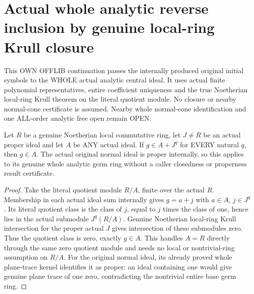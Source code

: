 \section{Actual whole analytic reverse inclusion by genuine local-ring Krull closure}
This OWN OFFLIB continuation passes the internally produced original initial symbols to the WHOLE actual analytic central ideal. It uses actual finite polynomial representatives, entire coefficient uniqueness and the true Noetherian local-ring Krull theorem on the literal quotient module. No closure or nearby normal-cone certificate is assumed. Nearby whole normal-cone identification and one ALL-order analytic free open remain OPEN.

\begin{lemma}
\label{hir:relative-normal-graph-central-actual-krull-ideal-closure}
\leanok
Let $R$ be a genuine Noetherian local commutative ring, let $J\ne R$ be an actual proper ideal and let $A$ be ANY actual ideal. If $g\in A+J^q$ for EVERY natural $q$, then $g\in A$. The actual original normal ideal is proper internally, so this applies to its genuine whole analytic germ ring without a caller closedness or properness result certificate.
\end{lemma}
\begin{proof}
Take the literal quotient module $R/A$, finite over the actual $R$. Membership in each actual ideal sum internally gives $g=a+j$ with $a\in A$, $j\in J^q$. Its literal quotient class is the class of $j$, equal to $j$ times the class of one, hence lies in the actual submodule $J^q(R/A)$. Genuine Noetherian local-ring Krull intersection for the proper actual $J$ gives intersection of these submodules zero. Thus the quotient class is zero, exactly $g\in A$. This handles $A=R$ directly through the same zero quotient module and needs no local or nontrivial-ring assumption on $R/A$. For the original normal ideal, its already proved whole plane-trace kernel identifies it as proper: an ideal containing one would give genuine plane trace of one zero, contradicting the nontrivial entire base germ ring.
\end{proof}


